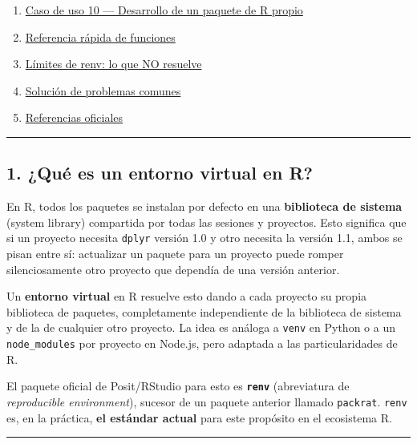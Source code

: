 \documentclass[
  man,
  floatsintext,
  longtable,
  a4paper,
  nolmodern,
  notxfonts,
  notimes,
  12pt,
  colorlinks=true,linkcolor=blue,citecolor=blue,urlcolor=blue]{apa7}
\begin{document}
\begin{enumerate}
{  de uso 9 --- Despliegue en servidor / Docker / Posit Connect}
\item
  \hyperref[16-caso-de-uso-10--desarrollo-de-un-paquete-de-r-propio]{Caso
  de uso 10 --- Desarrollo de un paquete de R propio}
\item
  \hyperref[17-referencia-ruxe1pida-de-funciones]{Referencia rápida de
  funciones}
\item
  \hyperref[18-luxedmites-de-renv-lo-que-no-resuelve]{Límites de renv:
  lo que NO resuelve}
\item
  \hyperref[19-soluciuxf3n-de-problemas-comunes]{Solución de problemas
  comunes}
\item
  \hyperref[20-referencias-oficiales]{Referencias oficiales}
\end{enumerate}

\begin{center}\rule{0.5\linewidth}{0.5pt}\end{center}

\subsection{1. ¿Qué es un entorno virtual en
R?}\label{quuxe9-es-un-entorno-virtual-en-r}

En R, todos los paquetes se instalan por defecto en una
\textbf{biblioteca de sistema} (system library) compartida por todas las
sesiones y proyectos. Esto significa que si un proyecto necesita
\texttt{dplyr} versión 1.0 y otro necesita la versión 1.1, ambos se
pisan entre sí: actualizar un paquete para un proyecto puede romper
silenciosamente otro proyecto que dependía de una versión anterior.

Un \textbf{entorno virtual} en R resuelve esto dando a cada proyecto su
propia biblioteca de paquetes, completamente independiente de la
biblioteca de sistema y de la de cualquier otro proyecto. La idea es
análoga a \texttt{venv} en Python o a un \texttt{node\_modules} por
proyecto en Node.js, pero adaptada a las particularidades de R.

El paquete oficial de Posit/RStudio para esto es \textbf{\texttt{renv}}
(abreviatura de \emph{reproducible environment}), sucesor de un paquete
anterior llamado \texttt{packrat}. \texttt{renv} es, en la práctica,
\textbf{el estándar actual} para este propósito en el ecosistema R.

\begin{center}\rule{0.5\linewidth}{0.5pt}\end{center}
\end{document}
